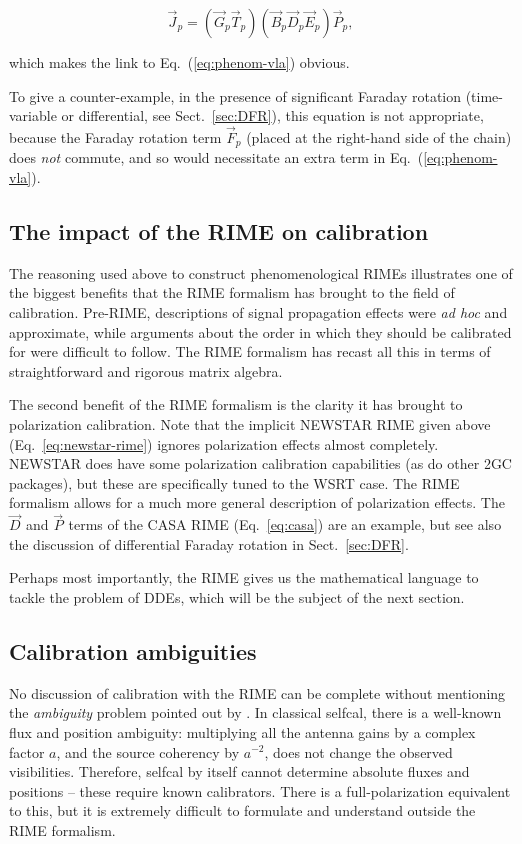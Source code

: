 \documentclass[referee]{aa}
\newcommand{\jones}[2]{\vec {#1}_{#2}}
\begin{document}
\[
\jones{J}{p} = (\jones{G}{p}\jones{T}{p})(\jones{B}{p}\jones{D}{p}\jones{E}{p})\jones{P}{p},
\]

which makes the link to Eq.~(\ref{eq:phenom-vla}) obvious. 

To give a counter-example, in the presence of significant Faraday rotation (time-variable or differential, see Sect.~\ref{sec:DFR}), this equation is not appropriate, because the Faraday rotation term $\jones{F}{p}$ (placed at the right-hand side of the chain) does \emph{not} commute, and so would necessitate an extra term in Eq.~(\ref{eq:phenom-vla}). 

\subsection{The impact of the RIME on calibration}

The reasoning used above to construct phenomenological RIMEs illustrates one of the biggest benefits that the RIME formalism has brought to the field of calibration. Pre-RIME, descriptions of signal propagation effects were \emph{ad hoc} and approximate, while arguments about the order in which they should be calibrated for were difficult to follow. The RIME formalism has recast all this in terms of straightforward and rigorous matrix algebra.

The second benefit of the RIME formalism is the clarity it has brought to polarization calibration. Note that the implicit NEWSTAR RIME given above (Eq.~\ref{eq:newstar-rime}) ignores polarization effects almost completely. NEWSTAR does have some polarization calibration capabilities (as do other 2GC packages), but these are specifically tuned to the WSRT case. The RIME formalism allows for a much more general description of polarization effects. The $\jones{D}{}$ and $\jones{P}{}$ terms of the CASA RIME (Eq.~\ref{eq:casa}) are an example, but see also the discussion of differential Faraday rotation in Sect.~\ref{sec:DFR}. 

Perhaps most importantly, the RIME gives us the mathematical language to tackle the problem of DDEs, which will be the subject of the next section.

\subsection{Calibration ambiguities}

No discussion of calibration with the RIME can be complete without mentioning the {\em ambiguity} problem pointed out by \citet{ME4,ME5}. In classical selfcal, there is a well-known flux and position ambiguity: multiplying all the antenna gains by a complex factor $a$, and the source coherency by $a^{-2}$, does not change the observed visibilities. Therefore, selfcal by itself cannot determine absolute fluxes and positions -- these require known calibrators. There is a full-polarization equivalent to this, but it is extremely difficult to formulate and understand outside the RIME formalism.
\end{document}

